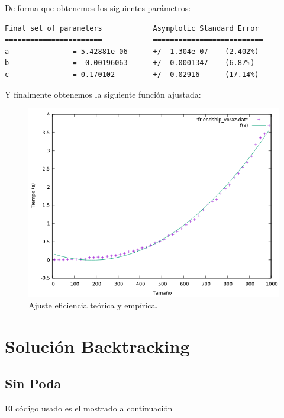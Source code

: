 De forma que obtenemos los siguientes parámetros:

\begin{shaded*}
\begin{verbatim}
Final set of parameters            Asymptotic Standard Error
=======================            ==========================
a               = 5.42881e-06      +/- 1.304e-07    (2.402%)
b               = -0.00196063      +/- 0.0001347    (6.87%)
c               = 0.170102         +/- 0.02916      (17.14%)
\end{verbatim}
\end{shaded*}

Y finalmente obtenemos la siguiente función ajustada:
\begin{figure}[H]
    \begin{center}
        \includegraphics[scale=0.7]{imagenes/vorazadj.png}
        \caption{Ajuste eficiencia teórica y empírica.}
        \label{fig3}
    \end{center}
\end{figure}




\section{Solución Backtracking}

\subsection{Sin Poda}
El código usado es el mostrado a continuación

